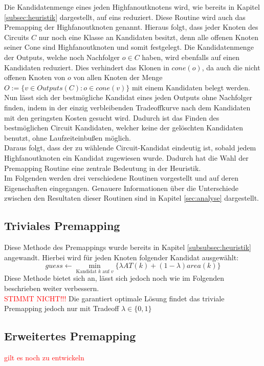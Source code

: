 \documentclass[11pt, a4paper, german]{article}
\begin{document}
 Die Kandidatenmenge eines jeden Highfanoutknotens wird, wie bereits in Kapitel \ref{subsec:heuristik} dargestellt, auf eins reduziert. Diese Routine wird auch das Premapping der Highfanoutknoten genannt. Hieraus folgt, dass jeder Knoten des Circuits $C$ nur noch eine Klasse an Kandidaten besitzt, denn alle offenen Knoten seiner Cone sind Highfanoutknoten und somit festgelegt.  Die Kandidatenmenge der Outputs, welche noch Nachfolger $o \in C$ haben, wird ebenfalls auf einen Kandidaten reduziert. Dies verhindert das Klonen in $cone(o)$, da  auch die nicht offenen Knoten von $o$ von allen Knoten der Menge $O := \{ v \in Outputs(C): o \in cone(v) \}$ mit einem Kandidaten belegt werden.\\
Nun lässt sich der bestmögliche Kandidat eines jeden Outputs ohne Nachfolger finden, indem in der einzig verbleibenden Tradeoffkurve nach dem Kandidaten mit den geringsten Kosten gesucht wird. Dadurch ist das Finden des  bestmöglichen Circuit Kandidaten,  welcher keine der gelöschten Kandidaten benutzt, ohne Laufzeiteinbußen möglich. \\
Daraus folgt, dass der zu wählende Circuit-Kandidat eindeutig ist, sobald jedem Highfanoutknoten ein Kandidat zugewiesen wurde. Dadurch hat die Wahl der Premapping Routine eine zentrale Bedeutung in der Heuristik.\\
Im Folgenden werden drei verschiedene Routinen vorgestellt und auf deren Eigenschaften eingegangen. Genauere Informationen über die Unterschiede zwischen den Resultaten dieser Routinen sind in Kapitel \ref{sec:analyse} dargestellt.

\subsection{Triviales Premapping}
\label{subsec:triviales_premapping}
Diese Methode des Premappings wurde bereits in Kapitel \ref{subsubsec:heuristik} angewandt. Hierbei wird für jeden Knoten folgender Kandidat ausgewählt: \[ guess \gets \min\limits_{\text{Kandidat }k\text{ auf }v}\{ \lambda AT(k) + (1-\lambda) area(k)  \} \]
Diese Methode bietet sich an, lässt sich jedoch noch wie im Folgenden beschrieben weiter verbessern. \\


\textcolor{red}{STIMMT NICHT!!!}
Die garantiert optimale Lösung findet das triviale Premapping jedoch nur mit Tradeoff $\lambda \in \{ 0,1 \}$ 
 
 
\subsection{Erweitertes Premapping}
\label{subsec:erweitertes_premapping}
\textcolor{red}{gilt es noch zu entwickeln} 
 
\end{document}
